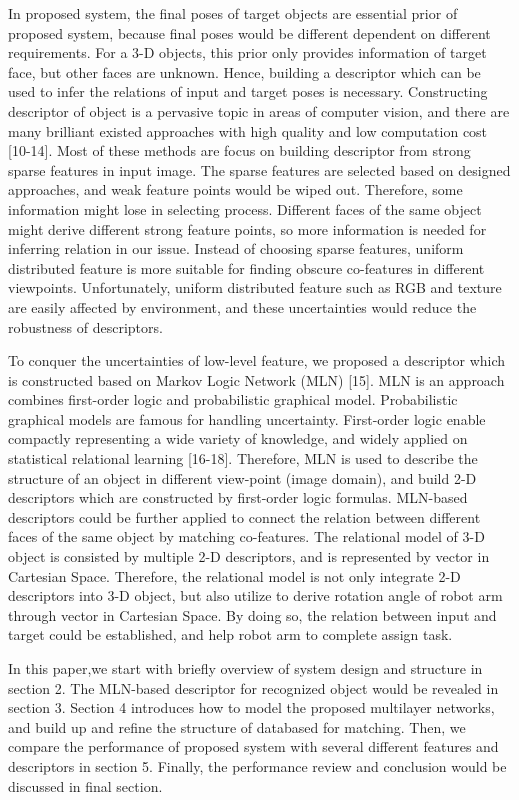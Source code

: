 \documentclass[journal]{IEEEtran}
\begin{document}
In proposed system, the final poses of target objects are essential prior of proposed system, because final poses would be different dependent on different requirements. For a 3-D objects, this prior only provides information of target face, but other faces are unknown. Hence, building a descriptor which can be used to infer the relations of input and target poses is necessary. Constructing descriptor of object is a pervasive topic in areas of computer vision, and there are many brilliant existed approaches with high quality and low computation cost [10-14]. Most of these methods are focus on building descriptor from strong sparse features in input image. The sparse features are selected based on designed approaches, and weak feature points would be wiped out. Therefore, some information might lose in selecting process. Different faces of the same object might derive different strong feature points, so more information is needed for inferring relation in our issue. Instead of choosing sparse features, uniform distributed feature is more suitable for finding obscure co-features in different viewpoints. Unfortunately, uniform distributed feature such as RGB and texture are easily affected by environment, and these uncertainties would reduce the robustness of descriptors.  

To conquer the uncertainties of low-level feature, we proposed a descriptor which is constructed based on Markov Logic Network (MLN) [15]. MLN is an approach combines first-order logic and probabilistic graphical model. Probabilistic graphical models are famous for handling uncertainty. First-order logic enable compactly representing a wide variety of knowledge, and widely applied on statistical relational learning [16-18].  Therefore, MLN is used to describe the structure of an object in different view-point (image domain), and build 2-D descriptors which are constructed by first-order logic formulas. MLN-based descriptors could be further applied to connect the relation between different faces of the same object by matching co-features. The relational model of 3-D object is consisted by multiple 2-D descriptors, and is represented by vector in Cartesian Space. Therefore, the relational model is not only integrate 2-D descriptors into 3-D object, but also utilize to derive rotation angle of robot arm through vector in Cartesian Space. By doing so, the relation between input and target could be established, and help robot arm to complete assign task.  

In this paper,we start with briefly overview of system design and structure in section 2. The MLN-based descriptor for recognized object would be revealed in section 3. Section 4 introduces how to model the proposed multilayer networks, and build up and refine the structure of databased for matching. Then, we compare the performance of proposed system with several different features and descriptors in section 5. Finally, the performance review and conclusion would be discussed in final section.
\end{document}
